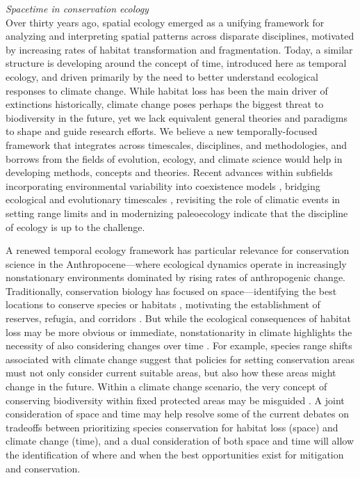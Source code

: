 \documentclass[11pt,a4paper,oneside]{article}
\begin{document}
\noindent \emph{Spacetime in conservation ecology}\\
\noindent Over thirty years ago, spatial ecology emerged as a unifying framework for analyzing and interpreting spatial patterns across disparate disciplines, motivated by increasing rates of habitat transformation and fragmentation. Today, a similar structure is developing around the concept of time, introduced here as temporal ecology, and driven primarily by the need to better understand ecological responses to climate change.  While habitat loss has been the main driver of extinctions historically, climate change poses perhaps the biggest threat to biodiversity in the future, yet we lack equivalent general theories and paradigms to shape and guide research efforts. We believe a new temporally-focused framework that integrates across timescales, disciplines, and methodologies, and borrows from the fields of evolution, ecology, and climate science would help in developing methods, concepts and theories. Recent advances within subfields incorporating environmental variability into coexistence models \citep{Chesson:1997dz}, bridging ecological and evolutionary timescales \citep{schoener2011}, revisiting the role of climatic events in setting range limits \citep{Tran2007} and in modernizing paleoecology \citep{Brewer2012} indicate that the discipline of ecology is up to the challenge. %

A renewed temporal ecology framework has particular relevance for conservation science in the Anthropocene---where ecological dynamics operate in increasingly nonstationary environments dominated by rising rates of anthropogenic change. Traditionally, conservation biology has focused on space---identifying the best locations to conserve species or habitats \citep[e.g.,][]{Cincotta:2000gk}, motivating the establishment of reserves, refugia, and corridors \citep[e.g.,][]{Doak:1989oc}. But while the ecological consequences of habitat loss may be more obvious or immediate, nonstationarity in climate highlights the necessity of also considering changes over time \citep{Hannah2002}. For example, species range shifts associated with climate change suggest that policies for setting conservation areas must not only consider current suitable areas, but also how these areas might change in the future. Within a climate change scenario, the very concept of conserving biodiversity within fixed protected areas may be misguided \citep{Rutherford1999}. A joint consideration of space and time may help resolve some of the current debates on tradeoffs between prioritizing species conservation for habitat loss (space) and climate change (time), and a dual consideration of both space and time will allow the identification of where and when the best opportunities exist for mitigation and conservation.
\end{document}
